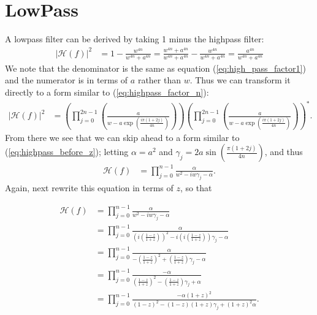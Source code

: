 \documentclass[a4paper]{article}
\begin{document}
\section{LowPass}
A lowpass filter can be derived by taking 1 minus the highpass filter:
\begin{align}
    |\mathcal{H}(f)|^2 &= 1 - \frac{w^{4n}}{w^{4n} + a^{4n}} = \frac{w^{4n} + a^{4n}}{w^{4n} + a^{4n}} - \frac{w^{4n}}{w^{4n} + a^{4n}} =  \frac{a^{4n}}{w^{4n} + a^{4n}} 
\end{align}
We note that the denominator is the same as equation (\ref{eq:high_pass_factor1}) and the numerator is in terms of $a$ rather than $w$. Thus we can transform it directly to a form similar to (\ref{eq:highpass_factor_n}):
\begin{align}
    |\mathcal{H}(f)|^2 
                           &= \left(\prod_{j=0}^{2 n - 1} \left(\frac{a}{w - a\exp\left(\frac{i \pi (1 + 2 j)}{4 n}\right)}\right)\right)
                          \left(\prod_{j=0}^{2 n - 1} \left(\frac{a}{w - a\exp\left(\frac{i \pi (1 + 2 j)}{4 n}\right)}\right)\right)^{*}\label{eq:lowpass_factor_n}.
\end{align}
From there we see that we can skip ahead to a form similar to (\ref{eq:highpass_before_z}); letting $\alpha = a^2$ and $\gamma_j = 2 a \sin\left(\frac{\pi (1 + 2 j)}{4 n}\right)$, and thus 
\begin{align}
    \mathcal{H}(f) &= \prod_{j=0}^{n - 1}\frac{\alpha }
        {w^2 - i w \gamma_j - \alpha}\label{eq:lowpass_before_z}.
\end{align}
Again, next rewrite this equation in terms of $z$, so that

\begin{align}
    \mathcal{H}(f) &= \prod_{j=0}^{n - 1}\frac{\alpha }
        {w^2 - i w \gamma_j - \alpha} \\
    &= \prod_{j=0}^{n - 1}\frac{\alpha }
        {\left(i\left(\frac{1 - z}{1 + z}\right)\right)^2 - i \left(i\left(\frac{1 - z}{1 + z}\right)\right) \gamma_j - \alpha} \\
    &= \prod_{j=0}^{n - 1}\frac{\alpha }
        {-\left(\frac{1 - z}{1 + z}\right)^2 +  \left(\frac{1 - z}{1 + z}\right) \gamma_j - \alpha} \\
    &= \prod_{j=0}^{n - 1}\frac{-\alpha }
        {\left(\frac{1 - z}{1 + z}\right)^2 -  \left(\frac{1 - z}{1 + z}\right) \gamma_j +  \alpha} \\
    &= \prod_{j=0}^{n - 1}\frac{-\alpha (1 + z)^2}
        {(1 - z)^2 - (1 - z)(1 + z) \gamma_j + (1 + z)^2 \alpha}.
\end{align}
\end{document}
